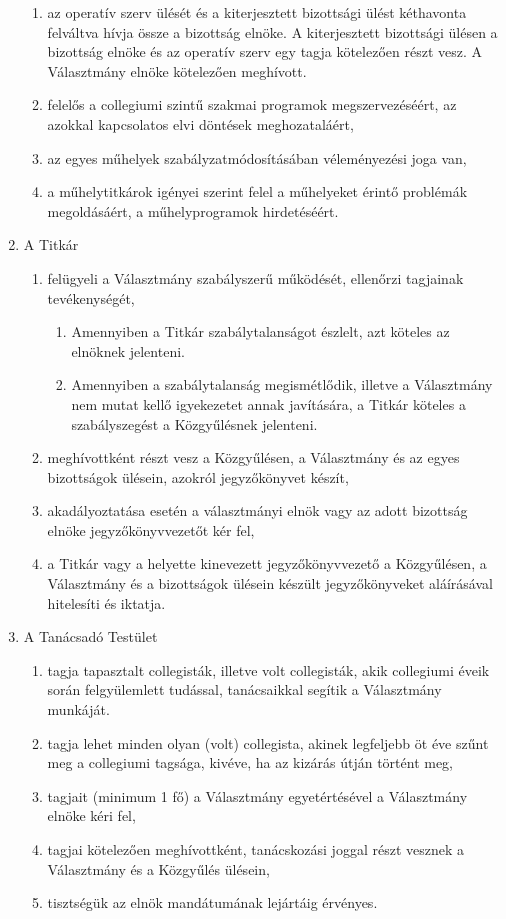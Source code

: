 \documentclass{../styles/rulebook}
\begin{document}
\begin{enumerate}
\begin{enumerate}
		\item az operatív szerv ülését és a kiterjesztett bizottsági ülést kéthavonta felváltva hívja össze a bizottság elnöke. A kiterjesztett bizottsági ülésen a bizottság elnöke és az operatív szerv egy tagja kötelezően részt vesz. A Választmány elnöke kötelezően meghívott.
		\item felelős a collegiumi szintű szakmai programok megszervezéséért, az azokkal kapcsolatos elvi döntések meghozataláért,
		\item az egyes műhelyek szabályzatmódosításában véleményezési joga van,
		\item a műhelytitkárok igényei szerint felel a műhelyeket érintő problémák megoldásáért, a műhelyprogramok hirdetéséért.
	\end{enumerate}
	\item A Titkár
	\begin{enumerate}
		\item felügyeli a Választmány szabályszerű működését, ellenőrzi tagjainak tevékenységét,
		\begin{enumerate}
			\item Amennyiben a Titkár szabálytalanságot észlelt, azt köteles az elnöknek jelenteni.
			\item Amennyiben a szabálytalanság megismétlődik, illetve a Választmány nem mutat kellő igyekezetet annak javítására, a Titkár köteles a szabályszegést a Közgyűlésnek jelenteni.
		\end{enumerate}
		\item meghívottként részt vesz a Közgyűlésen, a Választmány és az egyes bizottságok ülésein, azokról jegyzőkönyvet készít,
		\item akadályoztatása esetén a választmányi elnök vagy az adott bizottság elnöke jegyzőkönyvvezetőt kér fel,
		\item a Titkár vagy a helyette kinevezett jegyzőkönyvvezető a Közgyűlésen, a Választmány és a bizottságok ülésein készült jegyzőkönyveket aláírásával hitelesíti és iktatja.
	\end{enumerate}
	\item A Tanácsadó Testület
	\begin{enumerate}
		\item tagja tapasztalt collegisták, illetve volt collegisták, akik collegiumi éveik során felgyülemlett tudással, tanácsaikkal segítik a Választmány munkáját.
		\item tagja lehet minden olyan (volt) collegista, akinek legfeljebb öt éve szűnt meg a collegiumi tagsága, kivéve, ha az kizárás útján történt meg,
		\item tagjait (minimum 1 fő) a Választmány egyetértésével a Választmány elnöke kéri fel,
		\item tagjai kötelezően meghívottként, tanácskozási joggal részt vesznek a Választmány és a Közgyűlés ülésein,
		\item tisztségük az elnök mandátumának lejártáig érvényes.
	\end{enumerate}
\end{enumerate}
\end{document}
